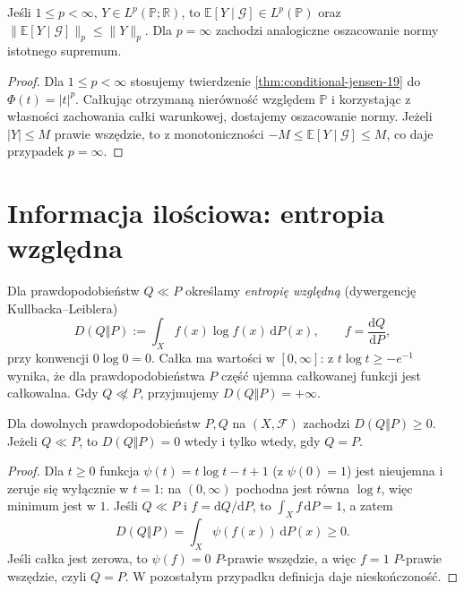 \begin{wniosek}[Kontrakcja w $L^p$]
\label{cor:conditional-lp-19}
Jeśli $1\le p<\infty$, $Y\in L^p(\mathbb P;\mathbb R)$,
to $\mathbb E[Y\mid\mathcal G]\in L^p(\mathbb P)$ oraz
$\|\mathbb E[Y\mid\mathcal G]\|_p\le\|Y\|_p$.
Dla $p=\infty$ zachodzi analogiczne oszacowanie
normy istotnego supremum.
\end{wniosek}
\begin{proof}
Dla $1\le p<\infty$ stosujemy twierdzenie
\ref{thm:conditional-jensen-19} do $\Phi(t)=|t|^p$.
Całkując otrzymaną nierówność względem $\mathbb P$
i korzystając z własności zachowania całki warunkowej,
dostajemy oszacowanie normy. Jeżeli $|Y|\le M$ prawie
wszędzie, to z monotoniczności
$-M\le\mathbb E[Y\mid\mathcal G]\le M$,
co daje przypadek $p=\infty$.
\end{proof}

\section{Informacja ilościowa: entropia względna}
Dla prawdopodobieństw $Q\ll P$ określamy
\emph{entropię względną} (dywergencję Kullbacka--Leiblera)
\[
 D(Q\Vert P):=\int_X f(x)\log f(x)\,\mathrm dP(x),
 \qquad f=\frac{\mathrm dQ}{\mathrm dP},
\]
przy konwencji $0\log0=0$. Całka ma wartości
w $[0,\infty]$: z $t\log t\ge -e^{-1}$
wynika, że dla prawdopodobieństwa $P$ część ujemna
całkowanej funkcji jest całkowalna. Gdy $Q\not\ll P$,
przyjmujemy $D(Q\Vert P)=+\infty$.

\begin{twierdzenie}
\label{thm:gibbs-19}
Dla dowolnych prawdopodobieństw $P,Q$ na $(X,\mathcal F)$
zachodzi $D(Q\Vert P)\ge0$. Jeżeli $Q\ll P$, to
$D(Q\Vert P)=0$ wtedy i tylko wtedy, gdy $Q=P$.
\end{twierdzenie}
\begin{proof}
Dla $t\ge0$ funkcja $\psi(t)=t\log t-t+1$
(z $\psi(0)=1$) jest nieujemna i zeruje się wyłącznie
w $t=1$: na $(0,\infty)$ pochodna jest równa $\log t$,
więc minimum jest w $1$. Jeśli $Q\ll P$ i $f=\mathrm dQ/\mathrm dP$,
to $\int_Xf\,\mathrm dP=1$, a zatem
\[
 D(Q\Vert P)=\int_X\psi(f(x))\,\mathrm dP(x)\ge0.
\]
Jeśli całka jest zerowa, to $\psi(f)=0$ $P$-prawie wszędzie,
a więc $f=1$ $P$-prawie wszędzie, czyli $Q=P$.
W pozostałym przypadku definicja daje nieskończoność.
\end{proof}


